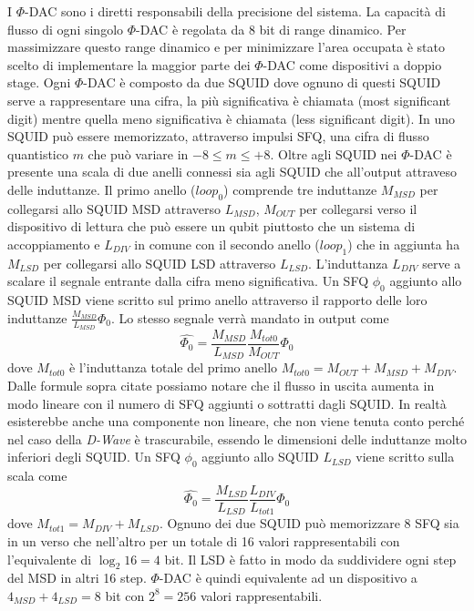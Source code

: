 \cite{ACI}I $\Phi$-DAC sono i diretti responsabili della precisione del sistema. La capacità di flusso di ogni singolo $\Phi$-DAC è regolata da 8 bit di range dinamico. Per massimizzare questo range dinamico e per minimizzare l'area occupata è stato scelto di implementare la maggior parte dei $\Phi$-DAC come dispositivi a doppio stage. Ogni $\Phi$-DAC è composto da due SQUID dove ognuno di questi SQUID serve a rappresentare una cifra, la più significativa è chiamata  (most significant digit) mentre quella meno significativa è chiamata  (less significant digit). In uno SQUID può essere memorizzato, attraverso impulsi SFQ, una cifra di flusso quantistico $m$ che può variare in $-8 \le m \le +8$. Oltre agli SQUID nei $\Phi$-DAC è presente una scala di due anelli connessi sia agli SQUID che all'output attraveso delle induttanze.
Il primo anello ($loop_0$) comprende tre induttanze $M_{MSD}$ per collegarsi allo SQUID MSD attraverso $L_{MSD}$, $M_{OUT}$ per collegarsi verso il dispositivo di lettura che può essere un qubit piuttosto che un sistema di accoppiamento e $L_{DIV}$ in comune con il secondo anello ($loop_1$) che in aggiunta ha $M_{LSD}$ per collegarsi allo SQUID LSD attraverso $L_{LSD}$. L'induttanza $L_{DIV}$ serve a scalare il segnale entrante dalla cifra meno significativa.
Un SFQ $\phi_0$ aggiunto allo SQUID MSD viene scritto sul primo anello attraverso il rapporto delle loro induttanze $\frac{M_{MSD}}{L_{MSD}}\Phi_0$.
Lo stesso segnale verrà mandato in output come
$$\hat{\Phi_0} = \frac{M_{MSD}}{L_{MSD}}\frac{M_{tot0}}{M_{OUT}}\Phi_0$$
dove $M_{tot0}$ è l'induttanza totale del primo anello $M_{tot0} = M_{OUT} + M_{MSD} + M_{DIV}$. Dalle formule sopra citate possiamo notare che il flusso in uscita aumenta in modo lineare con il numero di SFQ aggiunti o sottratti dagli SQUID. In realtà esisterebbe anche una componente non lineare, che non viene tenuta conto perché nel caso della \textit{D-Wave} è trascurabile, essendo le dimensioni delle induttanze molto inferiori degli SQUID.
Un SFQ $\phi_0$ aggiunto allo SQUID $L_{LSD}$ viene scritto sulla scala come
$$\hat{\Phi_0} = \frac{M_{LSD}}{L_{LSD}}\frac{L_{DIV}}{L_{tot1}}\Phi_0$$
dove $M_{tot1} = M_{DIV} + M_{LSD}$. Ognuno dei due SQUID può memorizzare 8 SFQ sia in un verso che nell'altro per un totale di 16 valori rappresentabili con l'equivalente di $\log_2{16} = 4$ bit. Il LSD è fatto in modo da suddividere ogni step del MSD in altri 16 step. $\Phi$-DAC è quindi equivalente ad un dispositivo a $4_{MSD} + 4_{LSD} = 8$ bit con $2^8 = 256$ valori rappresentabili.
